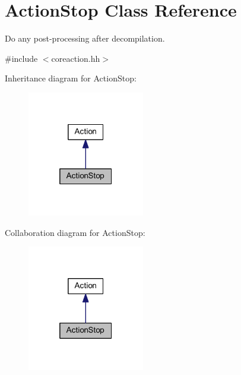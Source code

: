\hypertarget{class_action_stop}{}\section{Action\+Stop Class Reference}
\label{class_action_stop}


Do any post-\/processing after decompilation.  




{\ttfamily \#include $<$coreaction.\+hh$>$}



Inheritance diagram for Action\+Stop\+:
\nopagebreak
\begin{figure}[H]
\begin{center}
\leavevmode
\includegraphics[width=145pt]{class_action_stop__inherit__graph}
\end{center}
\end{figure}


Collaboration diagram for Action\+Stop\+:
\nopagebreak
\begin{figure}[H]
\begin{center}
\leavevmode
\includegraphics[width=145pt]{class_action_stop__coll__graph}
\end{center}
\end{figure}
